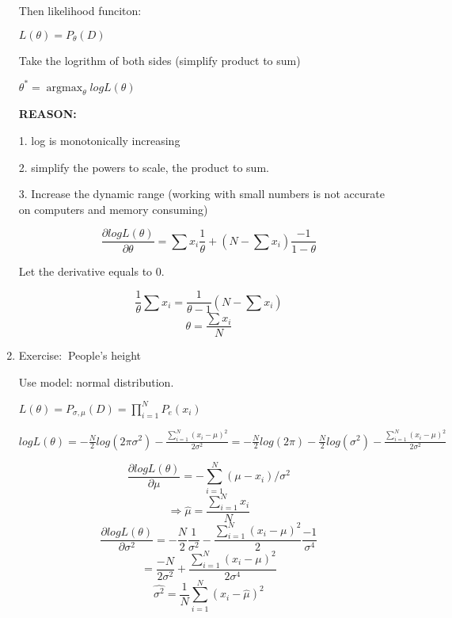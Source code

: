 \documentclass[12pt]{article}
\newcommand{\exe}{{\color{green} Exercise: $\ $}}
\DeclareMathOperator*{\argmax}{\arg\max}
\begin{document}
\begin{multicols}{2}
\begin{enumerate}
            Then likelihood funciton: 

            $L(\theta) = P_\theta(D)$

            Take the logrithm of both sides (simplify product to sum)

            $\theta^* = \argmax_\theta logL(\theta)$

            \textbf{REASON:} 
            
            1. log is monotonically increasing
            
            2. simplify the powers to scale, the product to sum.

            3. Increase the dynamic range (working with small numbers is not accurate on computers and memory consuming)

            $$\frac{\partial log L(\theta)}{\partial \theta} = \sum x_i \frac{1}{\theta} + (N - \sum x_i) \frac{-1}{1-\theta} $$

            Let the derivative equals to 0.

            $$\frac{1}{\theta}\sum x_i = \frac{1}{\theta -1}(N - \sum x_i)$$
            $$\theta = \frac{\sum x_i}{N}$$

            \item \exe People's height
            
            Use model: normal distribution.

            $L(\theta)= P_{\sigma, \mu}(D) = \prod \limits_{i = 1}^{N} P_e(x_i)$

            $logL(\theta) = -\frac{N}{2}log(2\pi\sigma^2) - \frac{\sum\limits_{i = 1}^{N}(x_i-\mu)^2}{2\sigma^2} = -\frac{N}{2}log(2\pi) -\frac{N}{2}log(\sigma^2) - \frac{\sum\limits_{i = 1}^{N}(x_i-\mu)^2}{2\sigma^2}$

            $$\frac{\partial logL(\theta)}{\partial \mu} = -\sum_{i = 1}^N (\mu - x_i)/ \sigma^2$$
            $$\Rightarrow \hat{\mu} =  \frac{\sum\limits_{i = 1}^{N} x_i}{N}$$
            $$\frac{\partial log L(\theta)}{\partial \sigma^2} =-\frac{N}{2}\frac{1}{\sigma^2} - \frac{\sum\limits_{i = 1}^{N}(x_i-\mu)^2}{2} \frac{-1}{\sigma^4}$$
            $$= \frac{-N}{2\sigma^2} + \frac{\sum\limits_{i = 1}^{N}(x_i-\mu)^2}{2\sigma^4}$$
            $$\hat{\sigma^{2}} = \frac{1}{N}\sum_{i = 1}^{N}(x_i - \hat{\mu})^2$$


\end{enumerate}
\end{multicols}
\end{document}
